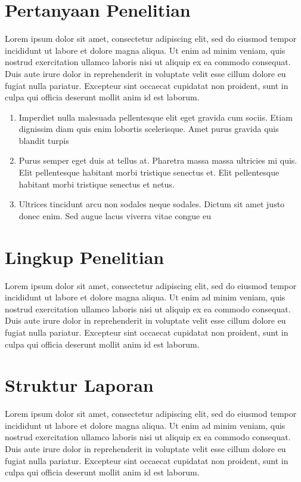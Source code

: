 \documentclass[12pt,hidelinks]{report}
\begin{document}
\section{Pertanyaan Penelitian}
    Lorem ipsum dolor sit amet, consectetur adipiscing elit, sed do eiusmod tempor incididunt ut labore et dolore magna aliqua. Ut enim ad minim veniam, quis nostrud exercitation ullamco laboris nisi ut aliquip ex ea commodo consequat. Duis aute irure dolor in reprehenderit in voluptate velit esse cillum dolore eu fugiat nulla pariatur. Excepteur sint occaecat cupidatat non proident, sunt in culpa qui officia deserunt mollit anim id est laborum.
\begin{enumerate}
  \item Imperdiet nulla malesuada pellentesque elit eget gravida cum sociis. Etiam dignissim diam quis enim lobortis scelerisque. Amet purus gravida quis blandit turpis
  \item Purus semper eget duis at tellus at. Pharetra massa massa ultricies mi quis. Elit pellentesque habitant morbi tristique senectus et. Elit pellentesque habitant morbi tristique senectus et netus.
  \item Ultrices tincidunt arcu non sodales neque sodales. Dictum sit amet justo donec enim. Sed augue lacus viverra vitae congue eu
\end{enumerate}

\section{Lingkup Penelitian}
    Lorem ipsum dolor sit amet, consectetur adipiscing elit, sed do eiusmod tempor incididunt ut labore et dolore magna aliqua. Ut enim ad minim veniam, quis nostrud exercitation ullamco laboris nisi ut aliquip ex ea commodo consequat. Duis aute irure dolor in reprehenderit in voluptate velit esse cillum dolore eu fugiat nulla pariatur. Excepteur sint occaecat cupidatat non proident, sunt in culpa qui officia deserunt mollit anim id est laborum. 

\section{Struktur Laporan}
    Lorem ipsum dolor sit amet, consectetur adipiscing elit, sed do eiusmod tempor incididunt ut labore et dolore magna aliqua. Ut enim ad minim veniam, quis nostrud exercitation ullamco laboris nisi ut aliquip ex ea commodo consequat. Duis aute irure dolor in reprehenderit in voluptate velit esse cillum dolore eu fugiat nulla pariatur. Excepteur sint occaecat cupidatat non proident, sunt in culpa qui officia deserunt mollit anim id est laborum. 
\end{document}
